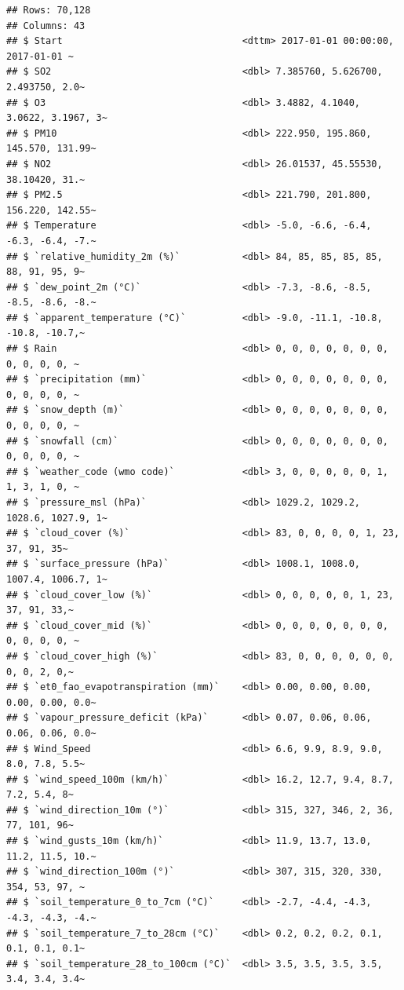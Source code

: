 \documentclass[
]{article}
\begin{document}
\begin{verbatim}
## Rows: 70,128
## Columns: 43
## $ Start                                <dttm> 2017-01-01 00:00:00, 2017-01-01 ~
## $ SO2                                  <dbl> 7.385760, 5.626700, 2.493750, 2.0~
## $ O3                                   <dbl> 3.4882, 4.1040, 3.0622, 3.1967, 3~
## $ PM10                                 <dbl> 222.950, 195.860, 145.570, 131.99~
## $ NO2                                  <dbl> 26.01537, 45.55530, 38.10420, 31.~
## $ PM2.5                                <dbl> 221.790, 201.800, 156.220, 142.55~
## $ Temperature                          <dbl> -5.0, -6.6, -6.4, -6.3, -6.4, -7.~
## $ `relative_humidity_2m (%)`           <dbl> 84, 85, 85, 85, 85, 88, 91, 95, 9~
## $ `dew_point_2m (°C)`                  <dbl> -7.3, -8.6, -8.5, -8.5, -8.6, -8.~
## $ `apparent_temperature (°C)`          <dbl> -9.0, -11.1, -10.8, -10.8, -10.7,~
## $ Rain                                 <dbl> 0, 0, 0, 0, 0, 0, 0, 0, 0, 0, 0, ~
## $ `precipitation (mm)`                 <dbl> 0, 0, 0, 0, 0, 0, 0, 0, 0, 0, 0, ~
## $ `snow_depth (m)`                     <dbl> 0, 0, 0, 0, 0, 0, 0, 0, 0, 0, 0, ~
## $ `snowfall (cm)`                      <dbl> 0, 0, 0, 0, 0, 0, 0, 0, 0, 0, 0, ~
## $ `weather_code (wmo code)`            <dbl> 3, 0, 0, 0, 0, 0, 1, 1, 3, 1, 0, ~
## $ `pressure_msl (hPa)`                 <dbl> 1029.2, 1029.2, 1028.6, 1027.9, 1~
## $ `cloud_cover (%)`                    <dbl> 83, 0, 0, 0, 0, 1, 23, 37, 91, 35~
## $ `surface_pressure (hPa)`             <dbl> 1008.1, 1008.0, 1007.4, 1006.7, 1~
## $ `cloud_cover_low (%)`                <dbl> 0, 0, 0, 0, 0, 1, 23, 37, 91, 33,~
## $ `cloud_cover_mid (%)`                <dbl> 0, 0, 0, 0, 0, 0, 0, 0, 0, 0, 0, ~
## $ `cloud_cover_high (%)`               <dbl> 83, 0, 0, 0, 0, 0, 0, 0, 0, 2, 0,~
## $ `et0_fao_evapotranspiration (mm)`    <dbl> 0.00, 0.00, 0.00, 0.00, 0.00, 0.0~
## $ `vapour_pressure_deficit (kPa)`      <dbl> 0.07, 0.06, 0.06, 0.06, 0.06, 0.0~
## $ Wind_Speed                           <dbl> 6.6, 9.9, 8.9, 9.0, 8.0, 7.8, 5.5~
## $ `wind_speed_100m (km/h)`             <dbl> 16.2, 12.7, 9.4, 8.7, 7.2, 5.4, 8~
## $ `wind_direction_10m (°)`             <dbl> 315, 327, 346, 2, 36, 77, 101, 96~
## $ `wind_gusts_10m (km/h)`              <dbl> 11.9, 13.7, 13.0, 11.2, 11.5, 10.~
## $ `wind_direction_100m (°)`            <dbl> 307, 315, 320, 330, 354, 53, 97, ~
## $ `soil_temperature_0_to_7cm (°C)`     <dbl> -2.7, -4.4, -4.3, -4.3, -4.3, -4.~
## $ `soil_temperature_7_to_28cm (°C)`    <dbl> 0.2, 0.2, 0.2, 0.1, 0.1, 0.1, 0.1~
## $ `soil_temperature_28_to_100cm (°C)`  <dbl> 3.5, 3.5, 3.5, 3.5, 3.4, 3.4, 3.4~

\end{verbatim}
\end{document}
